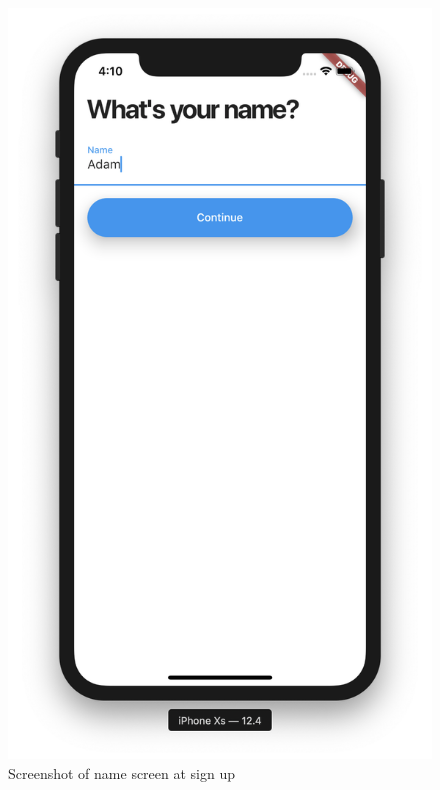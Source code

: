 \documentclass[12pt,openany,a4paper]{book}
\begin{document}
\begin{figure}[h]
	\centering\includegraphics[width=\textwidth]{NameScreen.png}
	\caption{Screenshot of name screen at sign up}
	\label{fig:name_screen}
	\end{figure}
\end{document}
